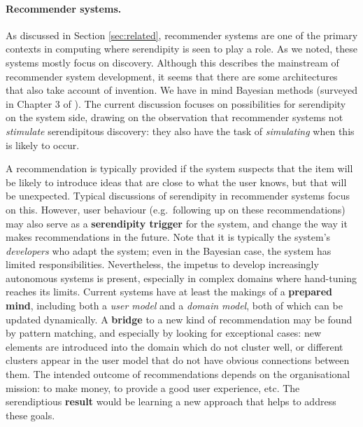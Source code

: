 \paragraph{Recommender systems.} 

As discussed in Section \ref{sec:related}, recommender systems are one
of the primary contexts in computing where serendipity is seen to play
a role.  As we noted, these systems mostly focus on discovery.
Although this describes the mainstream of recommender system
development, it seems that there are some architectures that also take
account of invention.  We have in mind Bayesian methods (surveyed in
Chapter 3 of ).  The current discussion
focuses on possibilities for serendipity on the system side, drawing
on the observation that recommender systems not \emph{stimulate}
serendipitous discovery: they also have the task of \emph{simulating}
when this is likely to occur.

A recommendation is typically provided if the system suspects that the
item will be likely to introduce ideas that are close to what the user
knows, but that will be unexpected.  Typical discussions of
serendipity in recommender systems focus on this.  However, user
behaviour (e.g.~following up on these recommendations) may also serve
as a \textbf{serendipity trigger} for the system, and change the way
it makes recommendations in the future.  Note that it is typically the
system's \emph{developers} who adapt the system; even in the Bayesian
case, the system has limited responsibilities.  Nevertheless, the
impetus to develop increasingly autonomous systems is present,
especially in complex domains where hand-tuning reaches its limits.
Current systems have at least the makings of a \textbf{prepared mind},
including both a \emph{user model} and a \emph{domain model}, both of
which can be updated dynamically.  A \textbf{bridge} to a new kind of
recommendation may be found by pattern matching, and especially by
looking for exceptional cases: new elements are introduced into the
domain which do not cluster well, or different clusters appear in the
user model that do not have obvious connections between them.  The
intended outcome of recommendations depends on the organisational
mission: to make money, to provide a good user experience, etc.  The
serendiptious \textbf{result} would be learning a new approach that
helps to address these goals.

